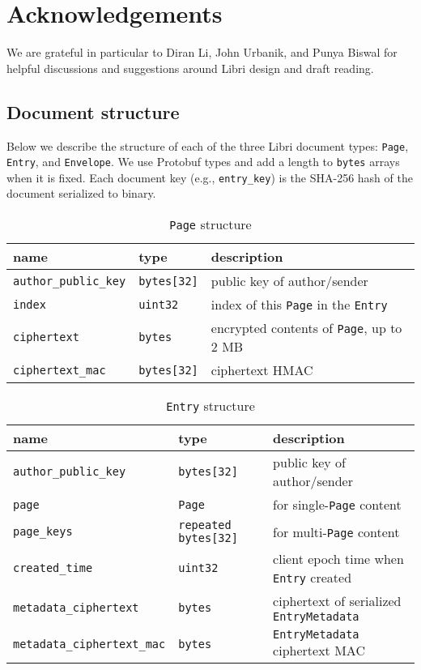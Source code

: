 \documentclass[10pt]{article}
\newcommand{\ttt}[1]{\texttt{#1}}
\def\Entry{\ttt{Entry}}
\def\Page{\ttt{Page}}
\def\Envelope{\ttt{Envelope}}
\begin{document}
\section*{Acknowledgements}
We are grateful in particular to Diran Li, John Urbanik, and Punya Biswal for helpful discussions and suggestions around Libri design and draft reading.

\begin{appendices}

\section{Document structure}
\label{app:docs}

Below we describe the structure of each of the three Libri document types: \Page{}, \Entry{}, and \Envelope{}. We use Protobuf types and add a length to \ttt{bytes} arrays when it is fixed. Each document key (e.g., \ttt{entry\_key}) is the SHA-256 hash of the document serialized to binary.

\begin{table}[htbp]
	\caption*{\Page{} structure}
	\begin{small}
	\begin{tabular}{lll}
		\toprule
		name & type  & description \\ \midrule
		\ttt{author\_public\_key} & \ttt{bytes[32]} & public key of author/sender \\
		\ttt{index} & \ttt{uint32} & index of this \Page{} in the \Entry{} \\
		\ttt{ciphertext} & \ttt{bytes} & encrypted contents of \Page{}, up to 2 MB \\
		\ttt{ciphertext\_mac} & \ttt{bytes[32]} & ciphertext HMAC \\
		\bottomrule
	\end{tabular}
	\end{small}
\end{table}

\begin{table}[htbp]
	\caption*{\Entry{} structure}
	\begin{small}
	\begin{tabular}{lll}
		\toprule
		name & type  & description \\ \midrule
		\ttt{author\_public\_key} & \ttt{bytes[32]} & public key of author/sender \\
		\ttt{page} & \ttt{Page} & for single-\Page{} content \\
		\ttt{page\_keys} & \ttt{repeated bytes[32]} & for multi-\Page{} content \\
		\ttt{created\_time} & \ttt{uint32} & client epoch time when \Entry{} created \\
		\ttt{metadata\_ciphertext} & \ttt{bytes} & ciphertext of serialized \ttt{EntryMetadata} \\
		\ttt{metadata\_ciphertext\_mac} & \ttt{bytes} & \ttt{EntryMetadata} ciphertext MAC \\
		\bottomrule
	\end{tabular}
	\end{small}
\end{table}



\end{appendices}
\end{document}
